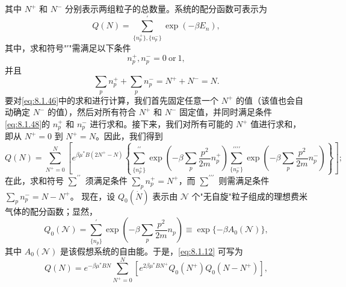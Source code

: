 其中 \(N^{+}\) 和 \(N^{-}\) 分别表示两组粒子的总数量。系统的配分函数可表示为
\begin{equation}\tag{8.1.46}\label{eq:8.1.46}
Q ( N ) = \sum _ { \{ n _ { p } ^{+} \} , \{ n _ { p } ^{-} \} } ^{\prime} \exp ( - \beta E _ { n } ) ,
\end{equation}
其中，求和符号"′"需满足以下条件
\begin{equation}\tag{8.1.47}\label{eq:8.1.47}
n _ { p } ^{+} , n _ { p } ^{-} = 0 \mathrm { ~ o r ~ } 1 ,
\end{equation}
并且
\begin{equation}\tag{8.1.48}\label{eq:8.1.48}
\sum _ { p } n _ { p } ^{+} + \sum _ { p } n _ { p } ^{-} = N ^{+} + N ^{-} = N .
\end{equation}
要对\autoref{eq:8.1.46}中的求和进行计算，我们首先固定任意一个 \(N^{+}\) 的值（该值也会自动确定 \(N^{-}\) 的值），然后对所有符合 \(N^{+}\) 和 \(N^{-}\) 固定值，并同时满足条件\autoref{eq:8.1.48}的 \(n_{p}^{+}\) 和 \(n_{p}^{-}\) 进行求和。接下来，我们对所有可能的 \(N^{+}\) 值进行求和，即从 \(N^{+}=0\) 到 \(N^{+}=N\)。因此，我们得到
\begin{equation}\tag{8.1.49}\label{eq:8.1.49}
Q ( N ) = \sum _ { N ^{+} = 0 } ^{N} \left[ e ^{\beta \mu ^ { *} B ( 2 N ^{+} - N ) } \left\{ \sum _ { \{ n _ { p } ^{+} \} } ^{\prime \prime} \exp \left( - \beta \sum _ { p } \frac { p ^{2} } { 2 m } n _ { p } ^{+} \right) \sum _ { \{ n _ { p } ^{-} \} } ^{\prime \prime \prime \prime} \exp \left( - \beta \sum _ { p } \frac { p ^{2} } { 2 m } n _ { p } ^{-} \right) \right\} \right] ;
\end{equation}
在此，求和符号 \(\sum^{\prime\prime}\) 须满足条件 \(\sum_{p}n_{p}^{+}=N^{+}\)，而 \(\sum^{\prime\prime\prime}\) 则需满足条件 \(\sum_{p}n_{p}^{-}=N-N^{+}\)。 现在，设 \(Q_{0}(\dot{N})\) 表示由 \(\mathcal{N}\) 个"无自旋"粒子组成的理想费米气体的配分函数；显然，
\begin{equation}\tag{8.1.50}\label{eq:8.1.50}
Q _ { 0 } ( \mathcal { N } ) = \sum _ { \{ n _ { p } \} } ^{\prime} \exp \left( - \beta \sum _ { p } \frac { p ^{2} } { 2 m } n _ { p } \right) \equiv \exp \{ - \beta A _ { 0 } ( \mathcal { N } ) \} ,
\end{equation}
其中 \(A_{0}(\mathcal{N})\) 是该假想系统的自由能。于是，\autoref{eq:8.1.12} 可写为
\begin{equation}\tag{8.1.51}\label{eq:8.1.51}
Q ( N ) = e ^{- \beta \mu ^ { *} B N } \sum _ { N ^{+} = 0 } ^{N} [ e ^{2 \beta \mu ^ { *} B N ^{+} } Q _ { 0 } ( N ^{+} ) Q _ { 0 } ( N - N ^{+} ) ] ,
\end{equation}
